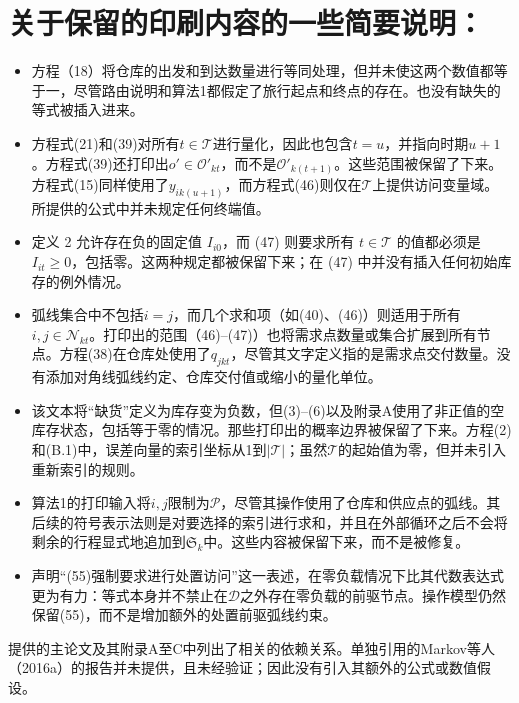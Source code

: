 \documentclass[10pt]{article}
\begin{document}
\section*{关于保留的印刷内容的一些简要说明：}
\begin{itemize}
\item 方程（18）将仓库的出发和到达数量进行等同处理，但并未使这两个数值都等于一，尽管路由说明和算法1都假定了旅行起点和终点的存在。也没有缺失的等式被插入进来。
\item 方程式(21)和(39)对所有$t\in\mathcal T$进行量化，因此也包含$t=u$，并指向时期$u+1$。方程式(39)还打印出$o'\in\mathcal O'_{kt}$，而不是$\mathcal O'_{k(t+1)}$。这些范围被保留了下来。方程式(15)同样使用了$y_{ik(u+1)}$，而方程式(46)则仅在$\mathcal T$上提供访问变量域。所提供的公式中并未规定任何终端值。
\item 定义 2 允许存在负的固定值 $I_{i0}$，而 (47) 则要求所有 $t\in\mathcal T$ 的值都必须是 $I_{it}\geqslant0$，包括零。这两种规定都被保留下来；在 (47) 中并没有插入任何初始库存的例外情况。
\item 弧线集合中不包括$i=j$，而几个求和项（如(40)、(46)）则适用于所有$i,j\in\mathcal N_{kt}$。打印出的范围（46)--(47)）也将需求点数量或集合扩展到所有节点。方程(38)在仓库处使用了$q_{jkt}$，尽管其文字定义指的是需求点交付数量。没有添加对角线弧线约定、仓库交付值或缩小的量化单位。
\item 该文本将“缺货”定义为库存变为负数，但(3)--(6)以及附录A使用了非正值的空库存状态，包括等于零的情况。那些打印出的概率边界被保留了下来。方程(2)和(B.1)中，误差向量的索引坐标从1到$|\mathcal T|$；虽然$\mathcal T$的起始值为零，但并未引入重新索引的规则。
\item 算法1的打印输入将$i,j$限制为$\mathcal P$，尽管其操作使用了仓库和供应点的弧线。其后续的符号表示法则是对要选择的索引进行求和，并且在外部循环之后不会将剩余的行程显式地追加到$\mathfrak S_k$中。这些内容被保留下来，而不是被修复。
\item 声明“(55)强制要求进行处置访问”这一表述，在零负载情况下比其代数表达式更为有力：等式本身并不禁止在$\mathcal D$之外存在零负载的前驱节点。操作模型仍然保留(55)，而不是增加额外的处置前驱弧线约束。
\end{itemize}
提供的主论文及其附录A至C中列出了相关的依赖关系。单独引用的Markov等人（2016a）的报告并未提供，且未经验证；因此没有引入其额外的公式或数值假设。
\end{document}
